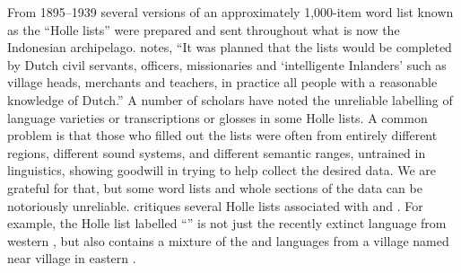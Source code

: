 From 1895--1939 several versions of an approximately 1,000-item
word list known as the “Holle lists” were prepared
and sent throughout what is now the Indonesian archipelago.
\citet[17]{Stokhof1980a} notes, “It was planned that the lists
would be completed by Dutch civil servants,
officers, missionaries and ‘intelligente Inlanders’ such as village
heads, merchants and teachers, in practice all people with a reasonable
knowledge of Dutch.” A number of scholars have noted the unreliable
labelling of language varieties or transcriptions or glosses
in some Holle lists.
A common problem is that those who filled out the lists were
often from entirely different regions,
different sound systems, and different semantic ranges,
untrained in linguistics, showing goodwill in trying to help
collect the desired data.
We are grateful for that,
but some word lists and whole sections of the data can be notoriously unreliable.
\citet[10--11]{Grimes1991c} critiques several Holle lists associated
with  and .
For example, the Holle list labelled “” \citep[63ff]{Stokhof1982b}
is not just the recently extinct  language from western
, but also contains a mixture of the 
and  languages from a village named  near 
village in eastern  \citep{Grimes2010b}.

